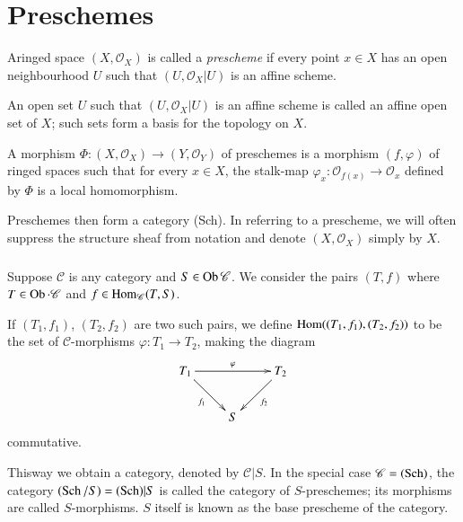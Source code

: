 \chapter{Preschemes}\label{chap2}

\begin{definition}\label{chap2-defi2.1}
A\pageoriginale ringed space $(X,\mathscr{O}_{X})$ is called a {\em
  prescheme} if every point $x\in X$ has an open neighbourhood $U$
such that $(U,\mathscr{O}_{X}|U)$ is an affine scheme.
\end{definition}

An open set $U$ such that $(U,\mathscr{O}_{X}|U)$ is an affine scheme
is called an affine open set of $X$; such sets form a basis for the
topology on $X$.

\setcounter{section}{1}
\setcounter{defin}{0}
\begin{defin}\label{chap2-defi2.1.1}
A morphism $\Phi:(X,\mathscr{O}_{X})\to (Y,\mathscr{O}_{Y})$ of
preschemes is a morphism $(f,\varphi)$ of ringed spaces such that for
every $x\in X$, the stalk-map $\varphi_{x}:\mathscr{O}_{f(x)}\to
\mathscr{O}_{x}$ defined by $\Phi$ is a local homomorphism.
\end{defin}

Preschemes then form a category (Sch). In referring to a prescheme, we
will often suppress the structure sheaf from notation and denote
$(X,\mathscr{O}_{X})$ simply by $X$.

\subsection{}\label{chap2-sec2.1.2}%
Suppose $\mathscr{C}$ is any category and $S\in\operatorname{Ob} \mathscr{C}$. We
consider the pairs $(T,f)$ where $T\in \operatorname{Ob}\cdot\mathscr{C}$ and $f\in
\operatorname{Hom}_{\mathscr{C}}(T,S)$. 

If $(T_{1},f_{1})$, $(T_{2},f_{2})$ are two such pairs, we define
$\Hom((T_{1},f_{1}),\break (T_{2},f_{2}))$ to be the set of
$\mathscr{C}$-morphisms $\varphi:T_{1}\to T_{2}$, making the diagram
\[
\xymatrix{
T_{1}\ar[rr]^{\varphi}\ar[dr]_{f_{1}} & & T_{2}\ar[dl]^{f_{2}}\\
 & S &
}
\] 
commutative.

This\pageoriginale way we obtain a category, denoted by $\mathscr{C}|S$. In the
special case $\mathscr{C}=(\operatorname{Sch})$, the category $(\operatorname{Sch}/S)=(\operatorname{Sch})|S$ is
called the category of $S$-preschemes; its morphisms are called
$S$-morphisms. $S$ itself is known as the base prescheme of the
category. 

